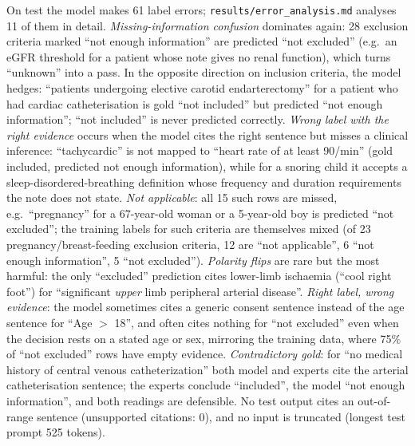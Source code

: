 \documentclass[conference]{IEEEtran}
\begin{document}
On test the model makes 61 label errors; \texttt{results/error\_analysis.md} analyses 11 of them in detail. \emph{Missing-information confusion} dominates again: 28 exclusion criteria marked ``not enough information'' are predicted ``not excluded'' (e.g.\ an eGFR threshold for a patient whose note gives no renal function), which turns ``unknown'' into a pass. In the opposite direction on inclusion criteria, the model hedges: ``patients undergoing elective carotid endarterectomy'' for a patient who had cardiac catheterisation is gold ``not included'' but predicted ``not enough information''; ``not included'' is never predicted correctly. \emph{Wrong label with the right evidence} occurs when the model cites the right sentence but misses a clinical inference: ``tachycardic'' is not mapped to ``heart rate of at least 90/min'' (gold included, predicted not enough information), while for a snoring child it accepts a sleep-disordered-breathing definition whose frequency and duration requirements the note does not state. \emph{Not applicable}: all 15 such rows are missed, e.g.\ ``pregnancy'' for a 67-year-old woman or a 5-year-old boy is predicted ``not excluded''; the training labels for such criteria are themselves mixed (of 23 pregnancy/breast-feeding exclusion criteria, 12 are ``not applicable'', 6 ``not enough information'', 5 ``not excluded''). \emph{Polarity flips} are rare but the most harmful: the only ``excluded'' prediction cites lower-limb ischaemia (``cool right foot'') for ``significant \emph{upper} limb peripheral arterial disease''. \emph{Right label, wrong evidence}: the model sometimes cites a generic consent sentence instead of the age sentence for ``Age $>$ 18'', and often cites nothing for ``not excluded'' even when the decision rests on a stated age or sex, mirroring the training data, where 75\% of ``not excluded'' rows have empty evidence. \emph{Contradictory gold}: for ``no medical history of central venous catheterization'' both model and experts cite the arterial catheterisation sentence; the experts conclude ``included'', the model ``not enough information'', and both readings are defensible. No test output cites an out-of-range sentence (unsupported citations: 0), and no input is truncated (longest test prompt 525 tokens).
\end{document}
